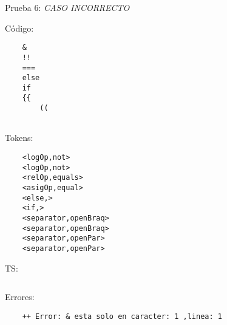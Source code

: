 \documentclass{article}
\begin{document}
Prueba 6: \textit{CASO INCORRECTO}%
\begin{flushleft}
Código:
\begin{verbatim}
    &
    !!
    ===
    else
    if
    {{
        ((
               
\end{verbatim}

Tokens:
\begin{verbatim}
    <logOp,not>
    <logOp,not>
    <relOp,equals>
    <asigOp,equal>
    <else,>
    <if,>
    <separator,openBraq>
    <separator,openBraq>
    <separator,openPar>
    <separator,openPar>
\end{verbatim}
    TS:
\begin{verbatim}

\end{verbatim}
Errores:
\begin{verbatim}
    ++ Error: & esta solo en caracter: 1 ,linea: 1
\end{verbatim}
\end{flushleft}
\end{document}
